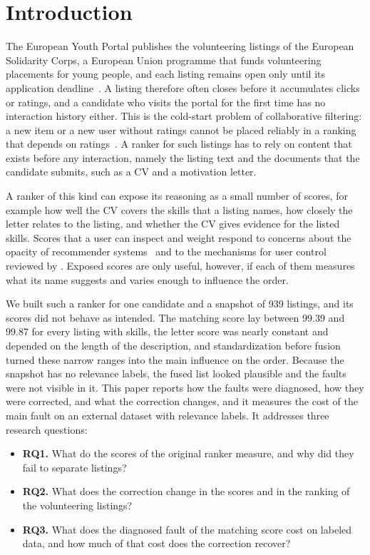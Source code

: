 \documentclass[CHICAGO]{USG}
\begin{document}
\maketitle

\section{Introduction}
\label{sec:introduction}

The European Youth Portal publishes the volunteering listings of the European Solidarity Corps, a European Union programme that funds volunteering placements for young people, and each listing remains open only until its application deadline~\citep{eyp}. A listing therefore often closes before it accumulates clicks or ratings, and a candidate who visits the portal for the first time has no interaction history either. This is the cold-start problem of collaborative filtering: a new item or a new user without ratings cannot be placed reliably in a ranking that depends on ratings~\citep{lika2014}. A ranker for such listings has to rely on content that exists before any interaction, namely the listing text and the documents that the candidate submits, such as a CV and a motivation letter.

A ranker of this kind can expose its reasoning as a small number of scores, for example how well the CV covers the skills that a listing names, how closely the letter relates to the listing, and whether the CV gives evidence for the listed skills. Scores that a user can inspect and weight respond to concerns about the opacity of recommender systems~\citep{ruohonen2024} and to the mechanisms for user control reviewed by \citet{jannach2017}. Exposed scores are only useful, however, if each of them measures what its name suggests and varies enough to influence the order.

We built such a ranker for one candidate and a snapshot of 939 listings, and its scores did not behave as intended. The matching score lay between 99.39 and 99.87 for every listing with skills, the letter score was nearly constant and depended on the length of the description, and standardization before fusion turned these narrow ranges into the main influence on the order. %
Because the snapshot has no relevance labels, the fused list looked plausible and the faults were not visible in it. This paper reports how the faults were diagnosed, how they were corrected, and what the correction changes, and it measures the cost of the main fault on an external dataset with relevance labels. It addresses three research questions:
\begin{itemize}
\item \textbf{RQ1.} What do the scores of the original ranker measure, and why did they fail to separate listings?
\item \textbf{RQ2.} What does the correction change in the scores and in the ranking of the volunteering listings?
\item \textbf{RQ3.} What does the diagnosed fault of the matching score cost on labeled data, and how much of that cost does the correction recover?
\end{itemize}
\end{document}
